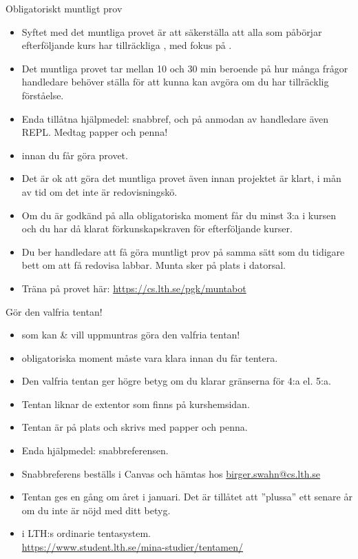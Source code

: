 \begin{SlideExtra}{Obligatoriskt muntligt prov}
\begin{itemize}\SlideFontSmall
  \item Syftet med det muntliga provet är att säkerställa att alla som påbörjar efterföljande kurs har tillräckliga , med fokus på .
  \item Det muntliga provet tar mellan 10 och 30 min beroende på hur många frågor handledare behöver ställa för att kunna kan avgöra om du har tillräcklig förståelse.
  \item Enda tillåtna hjälpmedel: snabbref, och på anmodan av handledare även REPL. Medtag papper och penna!
  \item {} innan du får göra  provet.
  \item Det är ok att göra det muntliga provet även innan projektet är klart, i mån av tid om  det inte är redovisningskö.
  \item Om du är godkänd på alla obligatoriska moment får du minst 3:a i kursen och du har då klarat förkunskapskraven för efterföljande kurser.
  \item Du ber handledare att få göra muntligt prov på samma sätt som du tidigare bett om att få redovisa labbar. Munta sker på plats i datorsal.
  \item Träna på provet här: \url{https://cs.lth.se/pgk/muntabot}
\end{itemize}  
\end{SlideExtra}

\begin{SlideExtra}{Gör den valfria tentan!}
\begin{itemize}\SlideFontSmall
  \item {} som kan \& vill uppmuntras göra den valfria tentan!
  \item {} obligatoriska moment måste vara klara innan du får tentera.
  \item Den valfria tentan ger högre betyg om du klarar gränserna för 4:a el. 5:a.
  \item Tentan liknar de extentor som finns på kurshemsidan.
  \item Tentan är på plats och skrivs med papper och penna. 
  \item Enda hjälpmedel: snabbreferensen.
  \item Snabbreferens beställs i Canvas och hämtas hos \url{birger.swahn@cs.lth.se}
  \item Tentan ges en gång om året i januari. Det är tillåtet att ''plussa'' ett senare år om du inte är nöjd med ditt betyg.
  \item {} i LTH:s ordinarie tentasystem. \\ %
  \url{https://www.student.lth.se/mina-studier/tentamen/} 
\end{itemize}
\end{SlideExtra}


